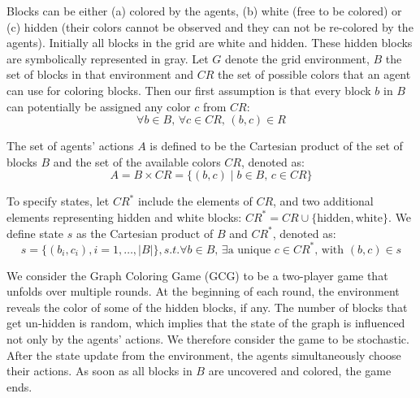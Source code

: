 \begin{flushleft}
\begin{flushleft}
        Blocks can be either (a) colored by the agents, (b) white (free to be colored) or (c) hidden (their colors cannot be observed and they can not be re-colored by the agents). Initially all blocks in the grid are white and hidden. These hidden blocks are symbolically represented in gray. Let $G$ denote the grid environment, $B$ the set of blocks in that environment and $CR$ the set of possible colors that an agent can use for coloring blocks. Then our first assumption is that every block $b$ in $B$ can potentially be assigned any color $c$ from $CR$:
        \begin{equation}
            \forall b \in B, \, \forall c \in CR, \, (b, c) \in R 
            \label{eq:bc}
        \end{equation}

        The set of agents' actions $A$ is defined to be the Cartesian product of the set of blocks $B$ and the set of the available colors $CR$, denoted as:
        \begin{equation}
            A = B \times CR = \{(b, c) \mid b \in B, \, c \in CR\} 
            \label{eq:action_space}
        \end{equation}

        To specify states, let $CR^*$ include the elements of $CR$, and two additional elements representing hidden and white blocks: $CR^* = CR \cup \{\text{hidden}, \text{white}\}$. We define state $s$ as the Cartesian product of $B$ and $CR^*$, denoted as:
        \begin{equation}
            s = \{(b_i, c_i), i=1, \dots, |B|\}, s.t. \forall b \in B, \, \exists \text{a unique } c \in CR^*\text{, with } (b,c) \in s
            \label{eq:state}
        \end{equation}

        We consider the Graph Coloring Game (GCG) to be a two-player game that unfolds over multiple rounds. At the beginning of each round, the environment reveals the color of some of the hidden blocks, if any. The number of blocks that get un-hidden is random, which implies that the state of the graph is influenced not only by the agents' actions. We therefore consider the game to be stochastic. After the state update from the environment, the agents simultaneously choose their actions. As soon as all blocks in $B$ are uncovered and colored, the game ends.
    
    \end{flushleft}


\end{flushleft}
